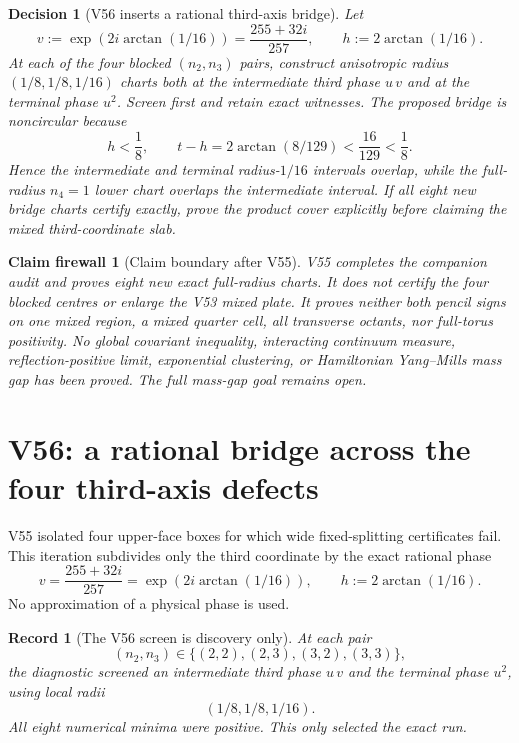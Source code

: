 \documentclass[11pt,oneside]{article}
\newtheorem{firewall}[theorem]{Claim firewall}
\newtheorem{record}[theorem]{Record}
\newtheorem{decision}[theorem]{Decision}
\theoremstyle{definition}
\theoremstyle{remark}
\begin{document}
\begin{decision}[V56 inserts a rational third-axis bridge]
\label{dec:newv55-next}
Let
\[
 v:=\exp(2i\arctan(1/16))=\frac{255+32i}{257},
\qquad h:=2\arctan(1/16).                             \tag{55.13}
\]
At each of the four blocked \((n_2,n_3)\) pairs, construct
anisotropic radius \((1/8,1/8,1/16)\) charts both at the intermediate
third phase \(u\,v\) and at the terminal phase \(u^2\).  Screen
first and retain exact witnesses.  The proposed bridge is
noncircular because
\[
 h<\frac18,\qquad
 t-h=2\arctan(8/129)<\frac{16}{129}<\frac18.          \tag{55.14}
\]
Hence the intermediate and terminal radius-\(1/16\) intervals
overlap, while the full-radius \(n_4=1\) lower chart overlaps the
intermediate interval.  If all eight new bridge charts certify
exactly, prove the product cover explicitly before claiming the
mixed third-coordinate slab.
\end{decision}

\begin{firewall}[Claim boundary after V55]
\label{fire:newv55-final}
V55 completes the companion audit and proves eight new exact
full-radius charts.  It does not certify the four blocked centres
or enlarge the V53 mixed plate.  It proves neither both pencil signs
on one mixed region, a mixed quarter cell, all transverse octants,
nor full-torus positivity.  No global covariant inequality,
interacting continuum measure, reflection-positive limit,
exponential clustering, or Hamiltonian Yang--Mills mass gap has
been proved.  The full mass-gap goal remains open.
\end{firewall}

\section{V56: a rational bridge across the four third-axis defects}
\label{sec:newv56-rational-bridge}

V55 isolated four upper-face boxes for which wide fixed-splitting
certificates fail.  This iteration subdivides only the third
coordinate by the exact rational phase
\[
 v=\frac{255+32i}{257}=\exp(2i\arctan(1/16)),
 \qquad h:=2\arctan(1/16).                            \tag{56.1}
\]
No approximation of a physical phase is used.

\begin{record}[The V56 screen is discovery only]
\label{rec:newv56-screen}
At each pair
\[
 (n_2,n_3)\in\{(2,2),(2,3),(3,2),(3,3)\},
\]
the diagnostic screened an intermediate third phase \(u\,v\) and
the terminal phase \(u^2\), using local radii
\[
 (1/8,1/8,1/16).                                     \tag{56.2}
\]
All eight numerical minima were positive.  This only selected the
exact run.
\end{record}
\end{document}
